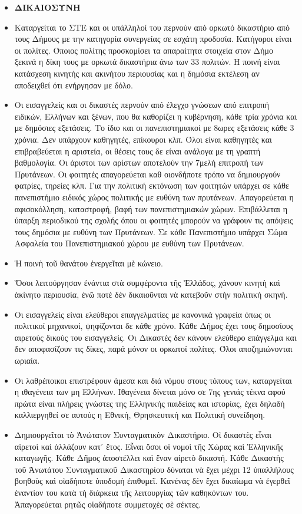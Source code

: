 \documentclass[a4paper]{article}
\begin{document}
\begin{itemize}
\item  \textbf{ΔΙΚΑΙΟΣΥΝΗ}

\item Καταργείται το ΣΤΕ και οι υπάλληλοί του περνούν από ορκωτό δικαστήριο από τους Δήμους με την κατηγορία συνεργείας σε εσχάτη προδοσία. Κατήγοροι είναι οι πολίτες. Όποιος πολίτης προσκομίσει τα απαραίτητα στοιχεία στον Δήμο ξεκινά η δίκη τους με ορκωτά δικαστήρια άνω των 33 πολιτών. Η ποινή είναι κατάσχεση κινητής και ακινήτου περιουσίας και η δημόσια εκτέλεση αν αποδειχθεί ότι  ενήργησαν με δόλο.
\item Οι εισαγγελείς και οι δικαστές περνούν από έλεγχο γνώσεων από επιτροπή ειδικών, Ελλήνων και ξένων, που θα καθορίζει η κυβέρνηση, κάθε τρία χρόνια και με δημόσιες εξετάσεις. Το ίδιο και οι πανεπιστημιακοί με 8ωρες εξετάσεις κάθε 3 χρόνια. Δεν υπάρχουν καθηγητές, επίκουροι κλπ. Όλοι είναι καθηγητές και επιβραβεύεται η αριστεία, οι θέσεις τους δε είναι ανάλογα με τη γραπτή βαθμολογία. Οι άριστοι των αρίστων αποτελούν την 7μελή επιτροπή των Πρυτάνεων. Οι φοιτητές απαγορεύεται καθ οιονδήποτε τρόπο να δημιουργούν φατρίες, τηρείες κλπ. Για την πολιτική εκτόνωση των φοιτητών υπάρχει σε κάθε πανεπιστήμιο ειδικός χώρος πολιτικής με ευθύνη των πρυτάνεων. Απαγορεύεται η αφισοκόλληση, καταστροφή, βαφή των πανεπιστημιακών χώρων. Επιβάλλεται η ύπαρξη περιοδικού της σχολής όπου οι φοιτητές μπορούν να γράφουν τις απόψεις τους δημόσια με ευθύνη των Πρυτάνεων. Σε κάθε Πανεπιστήμιο υπάρχει Σώμα Ασφαλεία του Πανεπιστημιακού χώρου με ευθύνη των Πρυτάνεων.
\item Ἡ ποινὴ τοῦ θανάτου ἐνεργεῖται μὲ κώνειο.
\item Ὅσοι λειτούργησαν ἐνάντια στὰ συμφέροντα τῆς Ἑλλάδος, χάνουν κινητὴ καὶ ἀκίνητο περιουσία, ἐνῶ ποτὲ δὲν δικαιοῦνται νὰ κατεβοῦν στὴν πολιτικὴ σκηνή.
\item Οι εισαγγελείς είναι ελεύθεροι επαγγελματίες με κανονικά γραφεία όπως οι πολιτικοί μηχανικοί, ψηφίζονται δε κάθε χρόνο. Κάθε Δήμος έχει τους δημοσίους αιρετούς δικούς του εισαγγελείς. Οι Δικαστές δεν κάνουν ελεύθερο επάγγελμα και δεν αποφασίζουν τις δίκες, παρά μόνον οι ορκωτοί πολίτες. Όλοι αποζημιώνονται ωριαία.
\item Οι λαθρέποικοι επιστρέφουν άμεσα και διά νόμου στους τόπους των, καταργείται η ιθαγένεια των μη Ελλήνων. Ιθαγένεια δίνεται μόνο σε 7ης γενιάς τέκνα αφού πρώτα είναι πλήρεις γνώστες της Ελληνικής παιδείας και ιστορίας, έχει δηλαδή καλλιεργηθεί σε αυτούς η Εθνική, Θρησκευτική και Πολιτική συνείδηση.
\item Δημιουργεῖται τὸ Ἀνώτατον Συνταγματικὸν Δικαστήριο. Οἱ δικαστὲς εἶναι αἱρετοὶ καὶ ἀλλάζουν κατ᾿ ἔτος. Εἶναι ὅσοι οἱ νομοὶ τῆς Χώρας καὶ Ἑλληνικῆς καταγωγῆς. Κάθε Δῆμος ἀποστέλλει καὶ ἕναν αἱρετὸ δικαστή. Κάθε Δικαστὴς τοῦ Ἀνωτάτου Συνταγματικοῦ Δικαστηρίου δύναται νὰ ἔχει μέχρι 12 ὑπαλλήλους βοηθοὺς καὶ οἱαδήποτε ὑποδομὴ ἐπιθυμεῖ. Κανένας δὲν ἔχει δικαίωμα νὰ ἐγερθεῖ ἐναντίον του κατὰ τὴ διάρκεια τῆς λειτουργίας τῶν καθηκόντων του. Ἀπαγορεύεται ρητῶς οἱαδήποτε συμμετοχὲς σὲ σέκτες. 

\end{itemize}
\end{document}
